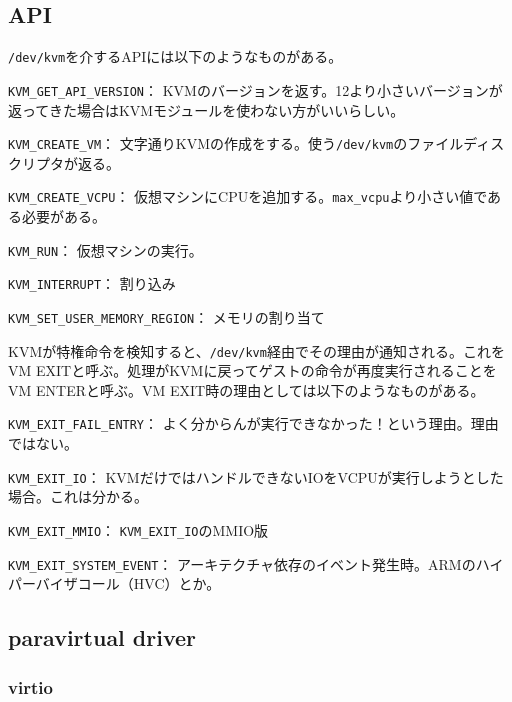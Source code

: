 ﻿\documentclass[9pt,b5paper,tombo,openany]{jsbook}
\begin{document}
\subsection{API}

\verb|/dev/kvm|を介するAPIには以下のようなものがある。

\begin{description}
  \item{\verb|KVM_GET_API_VERSION|：}
    KVMのバージョンを返す。12より小さいバージョンが返ってきた場合はKVMモジュールを使わない方がいいらしい。
  \item{\verb|KVM_CREATE_VM|：}
    文字通りKVMの作成をする。使う\verb|/dev/kvm|のファイルディスクリプタが返る。
  \item{\verb|KVM_CREATE_VCPU|：}
    仮想マシンにCPUを追加する。\verb|max_vcpu|より小さい値である必要がある。
  \item{\verb|KVM_RUN|：}
    仮想マシンの実行。
  \item{\verb|KVM_INTERRUPT|：}
    割り込み
  \item{\verb|KVM_SET_USER_MEMORY_REGION|：}
    メモリの割り当て
\end{description}

KVMが特権命令を検知すると、\verb|/dev/kvm|経由でその理由が通知される。これをVM EXITと呼ぶ。処理がKVMに戻ってゲストの命令が再度実行されることをVM ENTERと呼ぶ。VM EXIT時の理由としては以下のようなものがある。

\begin{description}
  \item{\verb|KVM_EXIT_FAIL_ENTRY|：}
    よく分からんが実行できなかった！という理由。理由ではない。
  \item{\verb|KVM_EXIT_IO|：}
    KVMだけではハンドルできないIOをVCPUが実行しようとした場合。これは分かる。
  \item{\verb|KVM_EXIT_MMIO|：}
    \verb|KVM_EXIT_IO|のMMIO版
  \item{\verb|KVM_EXIT_SYSTEM_EVENT|：}
    アーキテクチャ依存のイベント発生時。ARMのハイパーバイザコール（HVC）とか。
\end{description}

\subsection{paravirtual driver}

\subsubsection{virtio}
\end{document}
